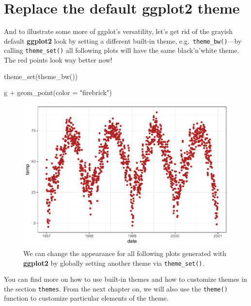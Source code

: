\documentclass[
]{krantz}
\makeatletter
\newenvironment{Shaded}{\begin{snugshade}}{\end{snugshade}}
\newcommand{\AttributeTok}[1]{\textcolor[rgb]{0.61,0.61,0.61}{#1}}
\newcommand{\FunctionTok}[1]{\textcolor[rgb]{0,0,0}{#1}}
\newcommand{\NormalTok}[1]{#1}
\newcommand{\SpecialCharTok}[1]{\textcolor[rgb]{0,0,0}{#1}}
\newcommand{\StringTok}[1]{\textcolor[rgb]{0.5,0.5,0.5}{#1}}
\newenvironment{kframe}{%
\medskip{}
\setlength{\fboxsep}{.8em}
 \def\at@end@of@kframe{}%
 \ifinner\ifhmode%
  \def\at@end@of@kframe{\end{minipage}}%
  \begin{minipage}{\columnwidth}%
 \fi\fi%
 \def\FrameCommand##1{\hskip\@totalleftmargin \hskip-\fboxsep
 \colorbox{shadecolor}{##1}\hskip-\fboxsep
     \hskip-\linewidth \hskip-\@totalleftmargin \hskip\columnwidth}%
 \MakeFramed {\advance\hsize-\width
   \@totalleftmargin\z@ \linewidth\hsize
   \@setminipage}}%
 {\par\unskip\endMakeFramed%
 \at@end@of@kframe}
\renewenvironment{Shaded}{\begin{kframe}}{\end{kframe}}
\makeatother
\begin{document}
\hypertarget{theme}{%
\section{\texorpdfstring{Replace the default \textbf{ggplot2} theme}{Replace the default ggplot2 theme}}\label{theme}}

And to illustrate some more of ggplot's versatility, let's get rid of the grayish default \textbf{ggplot2} look by setting a different built-in theme, e.g.~\texttt{theme\_bw()}---by calling \texttt{theme\_set()} all following plots will have the same black'n'white theme. The red points look way better now!

\begin{Shaded}
\begin{Highlighting}[]
\FunctionTok{theme\_set}\NormalTok{(}\FunctionTok{theme\_bw}\NormalTok{())}

\NormalTok{g }\SpecialCharTok{+} \FunctionTok{geom\_point}\NormalTok{(}\AttributeTok{color =} \StringTok{"firebrick"}\NormalTok{)}
\end{Highlighting}
\end{Shaded}

\begin{figure}
\centering
\includegraphics{bookdown_files/figure-latex/remove-gray-background-1.pdf}
\caption{\label{fig:remove-gray-background}We can change the appearance for all following plots generated with \textbf{ggplot2} by globally setting another theme via \texttt{theme\_set()}.}
\end{figure}

You can find more on how to use built-in themes and how to customize themes in the section \texttt{themes}. From the next chapter on, we will also use the \texttt{theme()} function to customize particular elements of the theme.
\end{document}
